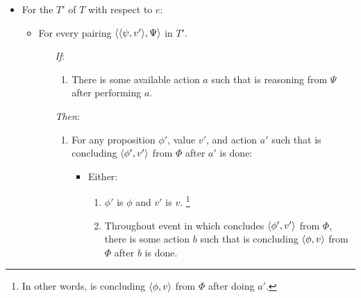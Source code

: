 \begin{note}
\begin{definition}[\vtC{2}]
    \begin{itemize}[noitemsep]
    \item
      For the  \(T'\) of \(T\) with respect to \(e\):
      \begin{itemize}[noitemsep]
      \item
        For every pairing \(\langle \langle \psi, v' \rangle, \Psi \rangle\) in \(T'\).
        \begin{itemize}[noitemsep]
        \item[\emph{If}:]
          \begin{enumerate}[label=\alph*., ref=(\alph*), series=tRSketch]
          \item
            There is some available action \(a\) such that \vAgent{} is reasoning from \(\Psi\) after performing \(a\).
          \end{enumerate}
        \item[\emph{Then}:]
          \begin{enumerate}[label=\alph*., ref=(\alph*), resume*=tRSketch]
          \item
            For any proposition \(\phi'\), value \(v'\), and action \(a'\) such that \vAgent{} is concluding \(\langle \phi', v' \rangle\) from \(\Phi\) after \(a'\) is done:
            \begin{itemize}
            \item
              Either:
              \begin{enumerate}[label=\arabic*., ref=(\arabic*)]
              \item
                \(\phi'\) is \(\phi\) and \(v'\) is \(v\).%
                \footnote{
                  In other words, \vAgent{} is concluding \(\langle \phi, v \rangle\) from \(\Phi\) after doing \(a'\).
                }
              \item
                Throughout event in which \vAgent{} concludes \(\langle \phi', v' \rangle\) from \(\Phi\), there is some action \(b\) such that \vAgent{} is concluding \(\langle \phi, v \rangle\) from \(\Phi\) after \(b\) is done.
              \end{enumerate}
            \end{itemize}
          \end{enumerate}
        \end{itemize}
      \end{itemize}
    \end{itemize}
    \vspace{-\baselineskip}
  \end{definition}
\end{note}






